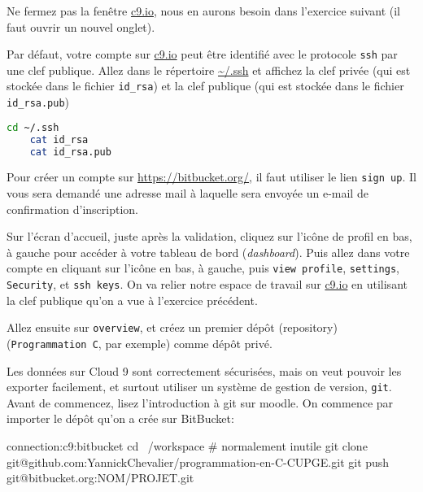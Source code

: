 \begin{fminipage}{0.9\textwidth}
  Ne fermez pas la fenêtre \url{c9.io}, nous en aurons besoin dans
  l'exercice suivant (il faut ouvrir un nouvel onglet).
\end{fminipage}

\question Par défaut, votre compte sur \url{c9.io} peut être identifié
avec le protocole \texttt{ssh} par une clef publique. Allez dans le répertoire \url{~/.ssh} et affichez la clef privée (qui est stockée dans le fichier \texttt{id\_rsa}) et la clef publique (qui est stockée dans le fichier \texttt{id\_rsa.pub})


\begin{solution}
  \begin{lstlisting}[language=bash]
    cd ~/.ssh
    cat id_rsa
    cat id_rsa.pub
  \end{lstlisting}
\end{solution}


Pour créer un compte sur \url{https://bitbucket.org/}, il faut
utiliser le lien \texttt{sign up}. Il vous sera demandé une adresse
mail à laquelle sera envoyée un e-mail de confirmation d'inscription.


\question Sur l'écran d'accueil, juste après la validation, cliquez
sur l'icône de profil en bas, à gauche pour accéder à votre tableau de
bord (\emph{dashboard}). Puis allez dans votre compte en cliquant sur
l'icône en bas, à gauche, puis \texttt{view profile},
\texttt{settings}, \texttt{Security}, et \texttt{ssh keys}. On va
relier notre espace de travail sur \url{c9.io} en utilisant la clef
publique qu'on a vue à l'exercice précédent.

\question Allez ensuite sur \texttt{overview}, et créez un premier
dépôt (repository) (\texttt{Programmation C}, par exemple) comme dépôt
privé. 


Les données sur Cloud 9 sont correctement sécurisées, mais on veut
pouvoir les exporter facilement, et surtout utiliser un système de
gestion de version, \texttt{git}. Avant de commencez, lisez
l'introduction à git sur moodle. On commence par importer le dépôt
qu'on a crée sur BitBucket:

\begin{solution}
  \begin{bash}{connection:c9:bitbucket}
    cd ~/workspace # normalement inutile
    git clone git@github.com:YannickChevalier/programmation-en-C-CUPGE.git
    git push git@bitbucket.org:NOM/PROJET.git
  \end{bash}
\end{solution}




